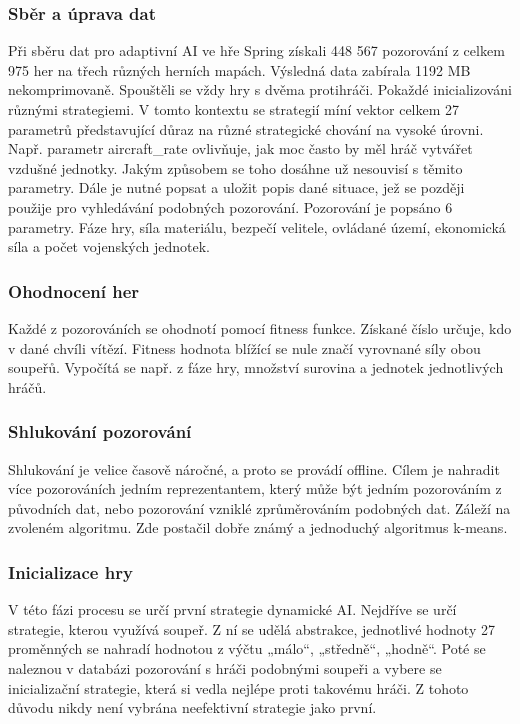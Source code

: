 \subsubsection{Sběr a úprava dat}

Při sběru dat pro adaptivní AI ve hře Spring získali 448 567 pozorování z celkem 975 her na třech různých herních mapách. Výsledná data zabírala 1192 MB nekomprimovaně. Spouštěli se vždy hry s dvěma protihráči. Pokaždé inicializováni různými strategiemi. V tomto kontextu se strategií míní vektor celkem 27 parametrů představující důraz na různé strategické chování na vysoké úrovni. Např. parametr aircraft\_rate ovlivňuje, jak moc často by měl hráč vytvářet vzdušné jednotky. Jakým způsobem se toho dosáhne už nesouvisí s těmito parametry. Dále je nutné popsat a uložit popis dané situace, jež se později použije pro vyhledávání podobných pozorování. Pozorování je popsáno 6 parametry. Fáze hry, síla materiálu, bezpečí velitele, ovládané území, ekonomická síla a počet vojenských jednotek.

\subsubsection{Ohodnocení her}

Každé z pozorováních se ohodnotí pomocí fitness funkce. Získané číslo určuje, kdo v dané chvíli vítězí. Fitness hodnota blížící se nule značí vyrovnané síly obou soupeřů. Vypočítá se např. z fáze hry, množství surovina a jednotek jednotlivých hráčů.

\subsubsection{Shlukování pozorování}

Shlukování je velice časově náročné, a proto se provádí offline. Cílem je nahradit více pozorováních jedním reprezentantem, který může být jedním pozorováním z původních dat, nebo pozorování vzniklé zprůměrováním podobných dat. Záleží na zvoleném algoritmu. Zde postačil dobře známý a jednoduchý algoritmus k-means.

\subsubsection{Inicializace hry}

V této fázi procesu se určí první strategie dynamické AI. Nejdříve se určí strategie, kterou využívá soupeř. Z ní se udělá abstrakce, jednotlivé hodnoty 27 proměnných se nahradí hodnotou z výčtu „málo“, „středně“, „hodně“.  Poté se naleznou v databázi pozorování s hráči podobnými soupeři a vybere se inicializační strategie, která si vedla nejlépe proti takovému hráči. Z tohoto důvodu nikdy není vybrána neefektivní strategie jako první.


